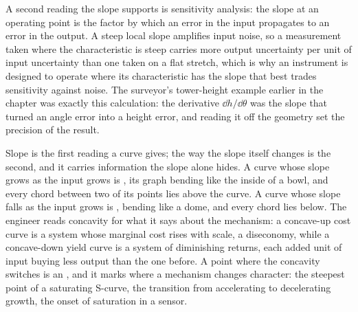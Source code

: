A second reading the slope supports is sensitivity analysis: the slope
at an operating point is the factor by which an error in the input
propagates to an error in the output. A steep local slope amplifies
input noise, so a measurement taken where the characteristic is steep
carries more output uncertainty per unit of input uncertainty than one
taken on a flat stretch, which is why an instrument is designed to
operate where its characteristic has the slope that best trades
sensitivity against noise. The surveyor's tower-height example earlier
in the chapter was exactly this calculation: the derivative
$\dd h/\dd\theta$ was the slope that turned an angle error into a height
error, and reading it off the geometry set the precision of the result.

Slope is the first reading a curve gives; the way the slope itself
changes is the second, and it carries information the slope alone hides.
A curve whose slope grows as the input grows is ,
its graph bending like the inside of a bowl, and every chord between two
of its points lies above the curve. A curve whose slope falls as the
input grows is , bending like a dome, and every
chord lies below. The engineer reads concavity for what it says about
the mechanism: a concave-up cost curve is a system whose marginal cost
rises with scale, a diseconomy, while a concave-down yield curve is a
system of diminishing returns, each added unit of input buying less
output than the one before. A point where the concavity switches is an
, and it marks where a mechanism changes character:
the steepest point of a saturating S-curve, the transition from
accelerating to decelerating growth, the onset of saturation in a
sensor.

